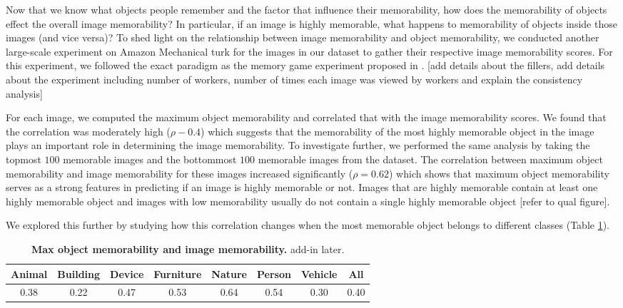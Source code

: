 Now that we know what objects people remember and the factor that influence their memorability, how does the memorability of objects effect the overall image memorability? In particular, if an image is highly memorable, what happens to memorability of objects inside those images (and vice versa)? To shed light on the relationship between image memorability and object memorability, we conducted another large-scale experiment on Amazon Mechanical turk for the images in our dataset to gather their respective image memorability scores. For this experiment, we followed the exact paradigm as the memory game experiment proposed in \cite{isola11}. [add details about the fillers, add details about the experiment including number of workers, number of times each image was viewed by workers and explain the consistency analysis]

For each image, we computed the maximum object memorability and correlated that with the image memorability scores. We found that the correlation was moderately high ($\rho-0.4$) which suggests that the memorability of the most highly memorable object in the image plays an important role in determining the image memorability. To investigate further, we performed the same analysis by taking the topmost $100$ memorable images and the bottommost $100$ memorable images from the dataset. The correlation between maximum object memorability and image memorability for these images increased significantly ($\rho=0.62$) which shows that maximum object memorability serves as a strong features in predicting if an image is highly memorable or not. Images that are highly memorable contain at least one highly memorable object and images with low memorability usually do not contain a single highly memorable object [refer to qual figure].

We explored this further by studying how this correlation changes when the most memorable object belongs to different classes (Table \ref{tab:tableMem}).  

\begin{table}[t]
    \begin{tabular}{cccccccc}
    \hline
    Animal & Building & Device & Furniture & Nature & Person & Vehicle & All  \\ \hline
    0.38   & 0.22     & 0.47   & 0.53      & 0.64   & 0.54   & 0.30    & 0.40 \\ \hline
    \end{tabular}
    \caption{\footnotesize\textbf{Max object memorability and image memorability.} add-in later. }\label{tab:tableMem}
\end{table}



